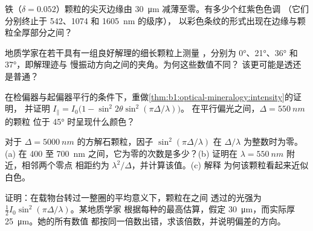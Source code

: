 \begin{exercise}[$\star\star$]\label{exo:b1:optical-mineralogy:8}
铁（$\delta = 0.052$）颗粒的尖灭边缘由
\qty{30}{\micro m} 减薄至零。有多少个红紫色色调
（它们分别终止于 542、1074 和 \qty{1605}{nm} 的级序），
以彩色条纹的形式出现在边缘与颗粒全厚部分之间？
\end{exercise}

\begin{exercise}[$\star\star$]\label{exo:b1:optical-mineralogy:9}
地质学家在若干具有一组良好解理的细长颗粒上测量
，分别为 \ang{0}、\ang{21}、\ang{36} 和 \ang{37}，即解理迹与
慢振动方向之间的夹角。为何这些数值不同？
该更可能是透还是普通？
\end{exercise}

\begin{exercise}[$\star\star\star$]\label{exo:b1:optical-mineralogy:10}
在检偏器与起偏器平行的条件下，重做\cref{thm:b1:optical-mineralogy:intensity}的证明，
并证明
$I_\parallel = I_0\bigl(1 - \sin^2 2\theta\sin^2(\pi\Delta/\lambda)\bigr)$。
在平行偏光之间，$\Delta = \qty{550}{nm}$ 的颗粒
位于 \ang{45} 时呈现什么颜色？
\end{exercise}

\begin{exercise}[$\star\star\star$]\label{exo:b1:optical-mineralogy:11}
对于 $\Delta = \qty{5000}{nm}$ 的方解石颗粒，因子
$\sin^2(\pi\Delta/\lambda)$ 在 $\Delta/\lambda$ 为整数时为零。
(a) 在 \num{400} 至
\qty{700}{nm} 之间，它为零的次数是多少？(b) 证明在 $\lambda = \qty{550}{nm}$ 附近，相邻两个零点
相距约为 $\lambda^2/\Delta$，并计算该值。(c) 解释
为何该颗粒看起来近似白色。
\end{exercise}

\begin{exercise}[$\star\star\star$]\label{exo:b1:optical-mineralogy:12}
证明：在载物台转过一整圈的平均意义下，颗粒在之间
透过的光强为 $\frac12 I_0\sin^2(\pi\Delta/\lambda)$。某地质学家
根据每种的最高估算，假定
\qty{30}{\micro m}，而实际厚 \qty{25}{\micro m}。她的所有数值
都按同一倍数出错，求该倍数，并说明偏差的方向。
\end{exercise}


